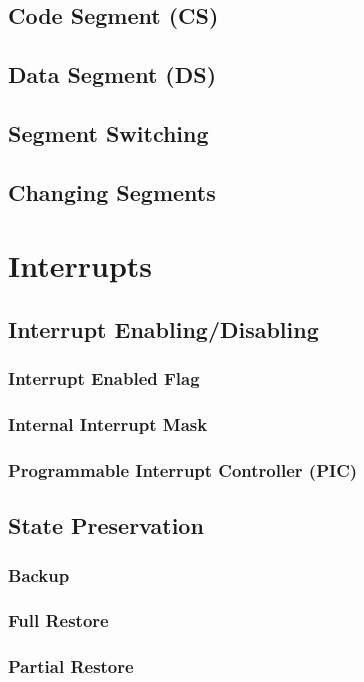 \documentclass[oneside, a4paper]{memoir}
\begin{document}
\section{Code Segment (CS)}
\section{Data Segment (DS)}
\section{Segment Switching}
\section{Changing Segments}

\chapter{Interrupts}
\label{ch:Interrupts}
\section{Interrupt Enabling/Disabling}
\label{sec:Interrupt Enabling/Disabling}
\subsection{Interrupt Enabled Flag}
\subsection{Internal Interrupt Mask}
\subsection{Programmable Interrupt Controller (PIC)}
\section{State Preservation}
\label{sec:State Preservation}
\subsection{Backup}
\subsection{Full Restore}
\subsection{Partial Restore}
\end{document}
